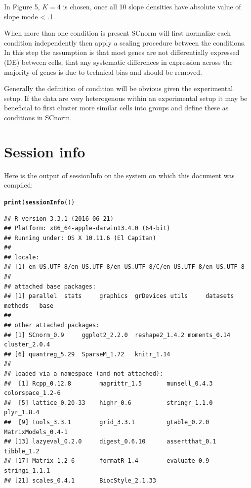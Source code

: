 \documentclass{article}\usepackage[]{graphicx}\usepackage[usenames,dvipsnames]{color}
\makeatletter
\newcommand{\hlstd}[1]{\textcolor[rgb]{0.345,0.345,0.345}{#1}}%
\newcommand{\hlkwd}[1]{\textcolor[rgb]{0.737,0.353,0.396}{\textbf{#1}}}%
\newenvironment{kframe}{%
 \def\at@end@of@kframe{}%
 \ifinner\ifhmode%
  \def\at@end@of@kframe{\end{minipage}}%
  \begin{minipage}{\columnwidth}%
 \fi\fi%
 \def\FrameCommand##1{\hskip\@totalleftmargin \hskip-\fboxsep
 \colorbox{shadecolor}{##1}\hskip-\fboxsep
     \hskip-\linewidth \hskip-\@totalleftmargin \hskip\columnwidth}%
 \MakeFramed {\advance\hsize-\width
   \@totalleftmargin\z@ \linewidth\hsize
   \@setminipage}}%
 {\par\unskip\endMakeFramed%
 \at@end@of@kframe}
\newenvironment{knitrout}{}{} %
\makeatother
\begin{document}
In Figure 5, $K = 4$ is chosen, once all 10 slope densities have absolute value of slope mode < .1.

\newpage

When more than one condition is present SCnorm will first normalize each condition independently then apply a scaling procedure between the conditions. In this step the assumption is that most genes are not differentially expressed (DE) between cells, that any systematic differences in expression across the majority of genes is due to technical bias and should be removed.

Generally the definition of condition will be obvious given the experimental setup. If the data are very heterogenous within an experimental setup it may be beneficial to first cluster more similar cells into groups and define these as conditions in SCnorm.

\section{Session info}
Here is the output of sessionInfo on the system on which this document was compiled:
\begin{knitrout}
\color{fgcolor}\begin{kframe}
\begin{alltt}
  \hlkwd{print}\hlstd{(}\hlkwd{sessionInfo}\hlstd{())}
\end{alltt}
\begin{verbatim}
## R version 3.3.1 (2016-06-21)
## Platform: x86_64-apple-darwin13.4.0 (64-bit)
## Running under: OS X 10.11.6 (El Capitan)
## 
## locale:
## [1] en_US.UTF-8/en_US.UTF-8/en_US.UTF-8/C/en_US.UTF-8/en_US.UTF-8
## 
## attached base packages:
## [1] parallel  stats     graphics  grDevices utils     datasets  methods   base     
## 
## other attached packages:
## [1] SCnorm_0.9     ggplot2_2.2.0  reshape2_1.4.2 moments_0.14   cluster_2.0.4 
## [6] quantreg_5.29  SparseM_1.72   knitr_1.14    
## 
## loaded via a namespace (and not attached):
##  [1] Rcpp_0.12.8        magrittr_1.5       munsell_0.4.3      colorspace_1.2-6  
##  [5] lattice_0.20-33    highr_0.6          stringr_1.1.0      plyr_1.8.4        
##  [9] tools_3.3.1        grid_3.3.1         gtable_0.2.0       MatrixModels_0.4-1
## [13] lazyeval_0.2.0     digest_0.6.10      assertthat_0.1     tibble_1.2        
## [17] Matrix_1.2-6       formatR_1.4        evaluate_0.9       stringi_1.1.1     
## [21] scales_0.4.1       BiocStyle_2.1.33
\end{verbatim}
\end{kframe}
\end{knitrout}
  
  \vspace{1cm}
%


%
\end{document}
